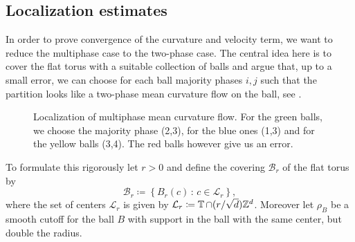 \subsection{Localization estimates}
\label{section_localization_estimates}
In order to prove convergence of the curvature and velocity term, we want to 
reduce the multiphase case to the two-phase case. The central idea here is to 
cover the flat torus with a suitable collection of balls and argue that, up to 
a 
small error, we can choose 
for each ball majority phases $ i, j $ such that the partition looks like a 
two-phase mean curvature flow on the ball, see 
.

\begin{figure}[h]
	\centering
	\caption{Localization of multiphase mean curvature flow. For the green 
	balls, we choose the majority phase (2,3), for the blue ones (1,3) and for 
	the yellow balls (3,4). The red balls however give us an error.}
	
	\label{figure_localization_of_mmcf}
\end{figure}

To formulate this rigorously let $ r > 0 $ and define the covering $ \mathcal{ 
B }_{ r 
} $ of the flat torus by
\begin{equation*}
	\mathcal{B}_{ r } \coloneqq
	\left\{
	B_{ r } ( c ) 
	\, \colon \,
	c \in \mathcal{ L }_{ r }
	\right\},
\end{equation*}
where the set of centers $ \mathcal{ L }_{ r } $ is given by $ \mathcal{ L }_{ 
	r } \coloneqq \operatorname{\mathbb{T}} \cap (r/\sqrt{ d }) \mathbb{ Z }^{ d } $. Moreover 
	let 
$ \rho_{ B } $ be a smooth cutoff for the ball $ B $ with support in the ball 
with the same center, but double the radius.

